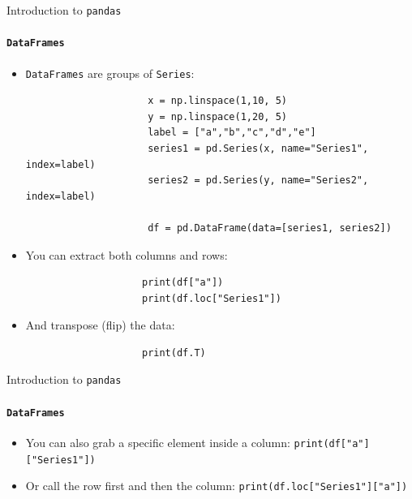 \documentclass[notes,11pt, aspectratio=169, xcolor=table]{beamer}
\begin{document}
        \begin{frame}[fragile=singleslide]{Introduction to \texttt{pandas}}
        \framesubtitle{\texttt{DataFrames}}
            
             \begin{itemize}
    
                \item \texttt{DataFrames} are groups of \texttt{Series}:
    
                    \begin{verbatim}
                     x = np.linspace(1,10, 5)
                     y = np.linspace(1,20, 5)
                     label = ["a","b","c","d","e"]
                     series1 = pd.Series(x, name="Series1", index=label)
                     series2 = pd.Series(y, name="Series2", index=label)
                     
                     df = pd.DataFrame(data=[series1, series2])
                    \end{verbatim}
                    
                \item You can extract both columns and rows:
                
                \begin{verbatim}
                    print(df["a"])
                    print(df.loc["Series1"])
                \end{verbatim}

                \item And transpose (flip) the data:
                
                \begin{verbatim}
                    print(df.T)
                \end{verbatim}
                    
            \end{itemize}             

        \end{frame}    

        \begin{frame}[fragile=singleslide]{Introduction to \texttt{pandas}}
        \framesubtitle{\texttt{DataFrames}}
            
             \begin{itemize}
    
                \item You can also grab a specific element inside a column: \texttt{print(df["a"]["Series1"])}

                \item Or call the row first and then the column: \texttt{print(df.loc["Series1"]["a"])}
        
            \end{itemize}             

        \end{frame}    
\end{document}
